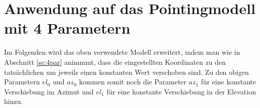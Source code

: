\section{Anwendung auf das Pointingmodell mit 4 Parametern}
Im Folgenden wird das oben verwendete Modell erweitert, indem man wie in Abschnitt \ref{se:4par} animmmt, dass die eingestellten Koordinaten zu den tatsächlichen um jeweils einen konstanten Wert verschoben sind. Zu den obigen Parametern $el_0$ und $az_0$ kommen somit noch die Parameter $az_1$ für eine konstante Verschiebung im Azimut und $el_1$ für eine konstante Verschiebung in der Elevation hinzu.
